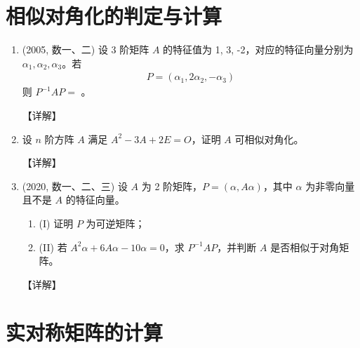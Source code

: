\documentclass[12pt, a4paper, oneside, UTF8]{ctexbook}
\begin{document}
\section{相似对角化的判定与计算}

\begin{enumerate}[label=\arabic*.,start=8]
    \item (2005, 数一、二) 设 3 阶矩阵 $A$ 的特征值为 1, 3, -2，对应的特征向量分别为 $\alpha_1, \alpha_2, \alpha_3$。若
    \begin{align*}
    P = (\alpha_1, 2\alpha_2, -\alpha_3)
    \end{align*}
    则 $P^{-1}AP = $ \underline{\hspace{3cm}}。
    
    \begin{solution}
    【详解】
    \end{solution}
    
    \item 设 $n$ 阶方阵 $A$ 满足 $A^2 - 3A + 2E = O$，证明 $A$ 可相似对角化。
    
    \begin{solution}
    【详解】
    \end{solution}
    
    \item (2020, 数一、二、三) 设 $A$ 为 2 阶矩阵，$P = (\alpha, A\alpha)$，其中 $\alpha$ 为非零向量且不是 $A$ 的特征向量。
    \begin{enumerate}
        \item (I) 证明 $P$ 为可逆矩阵；
        \item (II) 若 $A^2\alpha + 6A\alpha - 10\alpha = 0$，求 $P^{-1}AP$，并判断 $A$ 是否相似于对角矩阵。
    \end{enumerate}
    
    \begin{solution}
    【详解】
    \end{solution}
\end{enumerate}

\section{实对称矩阵的计算}
\end{document}
